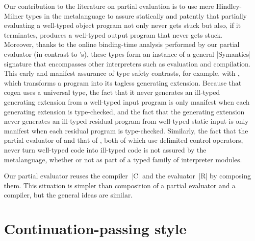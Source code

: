 Our contribution to the literature on partial evaluation is to use mere
Hindley-Milner types in the metalanguage to assure statically and patently that
partially evaluating a well-typed object program not only never gets stuck but
also, if it terminates, produces a well-typed output program that never gets
stuck.  Moreover, thanks to the online binding-time analysis performed by
our partial evaluator (in contrast to \citeauthor{Thiemann-combinators}'s),
these types form an instance of a general |Symantics|
signature that encompasses other interpreters such as evaluation and
compilation.  This early and manifest assurance of type safety contrasts, for
example, with \citet{Birkedal-PE-ML}, which transforms a program into its tagless
generating extension.  Because that cogen uses a universal type, the fact that
it never generates an ill-typed generating extension from a well-typed input
program is only manifest when each generating extension is type-checked, and the
fact that the generating extension never generates an ill-typed residual program
from well-typed static input is only manifest when each residual program is
type-checked.  Similarly, the fact that the partial evaluator of
\citet{fiore:nbe-ppdp2002} and that of
\citet{balat:tdpe-popl2004}, both of which use delimited control
operators, never turn well-typed code into ill-typed code is not assured by the
metalanguage, whether or not as part of a typed family of interpreter modules.
\begin{comment}
It is
type-directed, so the user must represent, as a term, the type of every
term to be partially evaluated.  We shift this work to the type checker
of the metalanguage.
By avoiding term-level type representations, our
approach makes it easier to perform algebraic simplifications (as
in~\S\ref{S:PE-solution}).
\end{comment}

Our partial evaluator reuses the
compiler~|C| and the evaluator~|R| by composing them.  This situation is
simpler than  composition of a partial
evaluator and a compiler, but the general ideas are similar.
\fi


\ifshort\else
\section{Continuation\hyp passing style}\label{variations}

